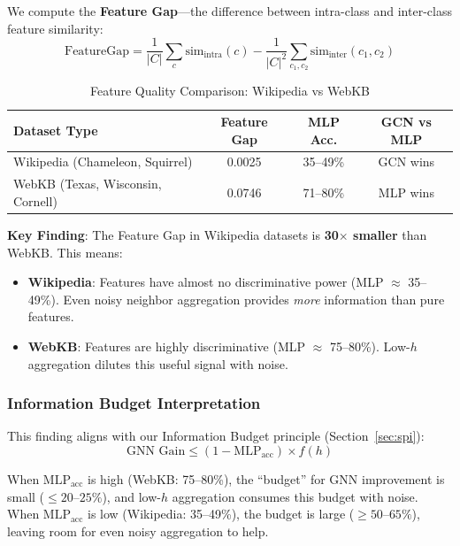 We compute the \textbf{Feature Gap}---the difference between intra-class and inter-class feature similarity:
\begin{equation}
\text{FeatureGap} = \frac{1}{|C|}\sum_{c} \text{sim}_{\text{intra}}(c) - \frac{1}{|C|^2}\sum_{c_1,c_2} \text{sim}_{\text{inter}}(c_1, c_2)
\end{equation}

\begin{table}[t]
\centering
\caption{Feature Quality Comparison: Wikipedia vs WebKB}
\label{tab:feature_quality}
\small
\begin{tabular}{@{}lccc@{}}
\toprule
\textbf{Dataset Type} & \textbf{Feature Gap} & \textbf{MLP Acc.} & \textbf{GCN vs MLP} \\
\midrule
Wikipedia (Chameleon, Squirrel) & 0.0025 & 35--49\% & GCN wins \\
WebKB (Texas, Wisconsin, Cornell) & 0.0746 & 71--80\% & MLP wins \\
\bottomrule
\end{tabular}
\end{table}

\textbf{Key Finding}: The Feature Gap in Wikipedia datasets is \textbf{30$\times$ smaller} than WebKB. This means:
\begin{itemize}
    \item \textbf{Wikipedia}: Features have almost no discriminative power (MLP $\approx$ 35--49\%). Even noisy neighbor aggregation provides \textit{more} information than pure features.
    \item \textbf{WebKB}: Features are highly discriminative (MLP $\approx$ 75--80\%). Low-$h$ aggregation dilutes this useful signal with noise.
\end{itemize}

\subsubsection{Information Budget Interpretation}

This finding aligns with our Information Budget principle (Section~\ref{sec:spi}):
\begin{equation}
\text{GNN Gain} \leq (1 - \text{MLP}_{\text{acc}}) \times f(h)
\end{equation}

When $\text{MLP}_{\text{acc}}$ is high (WebKB: 75--80\%), the ``budget'' for GNN improvement is small ($\leq 20$--$25\%$), and low-$h$ aggregation consumes this budget with noise. When $\text{MLP}_{\text{acc}}$ is low (Wikipedia: 35--49\%), the budget is large ($\geq 50$--$65\%$), leaving room for even noisy aggregation to help.


